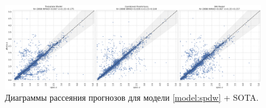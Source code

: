 \documentclass[fleqn,usenatbib]{mnras}
\begin{document}
\begin{figure}
    \centering
    \includegraphics[width=0.9\linewidth]{images/scatterplots-stripe82x-sota-combined.png}
    \caption{Диаграммы рассеяния прогнозов для модели \ref{model:spdw} + SOTA.}
    \label{fig:s82x-sota35}
\end{figure}

\end{document}
